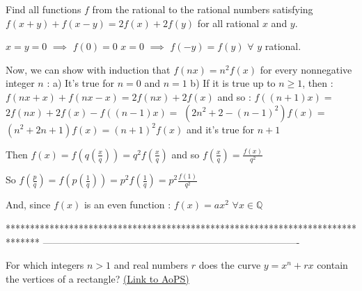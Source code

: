 \begin{mysolution}
	\begin{tcolorbox}Find all functions $ f$  from the rational to the rational numbers satisfying $ f(x+y)+f(x-y)=2f(x)+2f(y)$ for all rational $ x$ and $ y$.\end{tcolorbox}
$ x=y=0$ $ \implies$ $ f(0)=0$
$ x=0$ $ \implies$ $ f(-y)=f(y)$ $ \forall$ $ y$ rational.

Now, we can show with induction that $ f(nx)=n^{2}f(x)$ for every nonnegative integer $ n$ :
a) It's true for $ n=0$ and $ n=1$
b) If it is true up to $ n\geq 1$, then :$ f(nx+x)+f(nx-x)=2f(nx)+2f(x)$ and so :
$ f((n+1)x)=$ $ 2f(nx)+2f(x)-f((n-1)x)=$ $ (2n^{2}+2-(n-1)^{2})f(x)=$ $ (n^{2}+2n+1)f(x)=(n+1)^{2}f(x)$ and it's true for $ n+1$

Then $ f(x)=f(q(\frac{x}{q}))=q^{2}f(\frac{x}{q})$ and so $ f(\frac{x}{q})=\frac{f(x)}{q^{2}}$

So $ f(\frac{p}{q})=f(p(\frac{1}{q}))=p^{2}f(\frac{1}{q})=p^{2}\frac{f(1)}{q^{2}}$

And, since $ f(x)$ is an even function : $ f(x)=ax^{2}$ $ \forall x\in\mathbb{Q}$
\end{mysolution}
*******************************************************************************
-------------------------------------------------------------------------------

\begin{problem}
	For which integers $ n>1$ and real numbers $ r$ does the curve $ y=x^{n}+rx$ contain the vertices of a rectangle?
	\flushright \href{https://artofproblemsolving.com/community/c6h160311}{(Link to AoPS)}
\end{problem}



